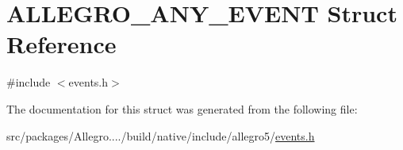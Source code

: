 \hypertarget{struct_a_l_l_e_g_r_o___a_n_y___e_v_e_n_t}{}\section{A\+L\+L\+E\+G\+R\+O\+\_\+\+A\+N\+Y\+\_\+\+E\+V\+E\+NT Struct Reference}
\label{struct_a_l_l_e_g_r_o___a_n_y___e_v_e_n_t}


{\ttfamily \#include $<$events.\+h$>$}



The documentation for this struct was generated from the following file\+:\begin{DoxyCompactItemize}
\item 
src/packages/\+Allegro..../build/native/include/allegro5/\hyperlink{events_8h}{events.\+h}\end{DoxyCompactItemize}

